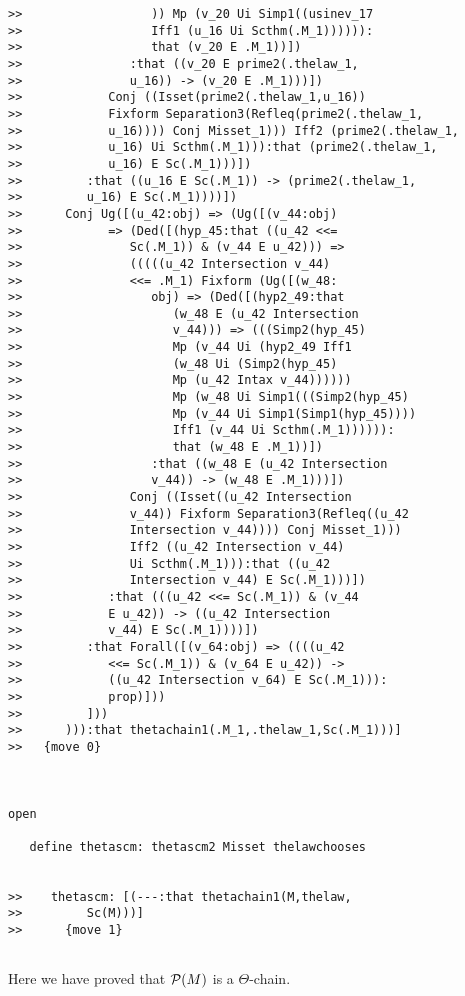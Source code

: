 \documentclass[12pt]{article}
\begin{document}
\begin{verbatim}
>>                  )) Mp (v_20 Ui Simp1((usinev_17
>>                  Iff1 (u_16 Ui Scthm(.M_1)))))):
>>                  that (v_20 E .M_1))])
>>               :that ((v_20 E prime2(.thelaw_1,
>>               u_16)) -> (v_20 E .M_1)))])
>>            Conj ((Isset(prime2(.thelaw_1,u_16))
>>            Fixform Separation3(Refleq(prime2(.thelaw_1,
>>            u_16)))) Conj Misset_1))) Iff2 (prime2(.thelaw_1,
>>            u_16) Ui Scthm(.M_1))):that (prime2(.thelaw_1,
>>            u_16) E Sc(.M_1)))])
>>         :that ((u_16 E Sc(.M_1)) -> (prime2(.thelaw_1,
>>         u_16) E Sc(.M_1))))])
>>      Conj Ug([(u_42:obj) => (Ug([(v_44:obj)
>>            => (Ded([(hyp_45:that ((u_42 <<=
>>               Sc(.M_1)) & (v_44 E u_42))) =>
>>               (((((u_42 Intersection v_44)
>>               <<= .M_1) Fixform (Ug([(w_48:
>>                  obj) => (Ded([(hyp2_49:that
>>                     (w_48 E (u_42 Intersection
>>                     v_44))) => (((Simp2(hyp_45)
>>                     Mp (v_44 Ui (hyp2_49 Iff1
>>                     (w_48 Ui (Simp2(hyp_45)
>>                     Mp (u_42 Intax v_44))))))
>>                     Mp (w_48 Ui Simp1(((Simp2(hyp_45)
>>                     Mp (v_44 Ui Simp1(Simp1(hyp_45))))
>>                     Iff1 (v_44 Ui Scthm(.M_1)))))):
>>                     that (w_48 E .M_1))])
>>                  :that ((w_48 E (u_42 Intersection
>>                  v_44)) -> (w_48 E .M_1)))])
>>               Conj ((Isset((u_42 Intersection
>>               v_44)) Fixform Separation3(Refleq((u_42
>>               Intersection v_44)))) Conj Misset_1)))
>>               Iff2 ((u_42 Intersection v_44)
>>               Ui Scthm(.M_1))):that ((u_42
>>               Intersection v_44) E Sc(.M_1)))])
>>            :that (((u_42 <<= Sc(.M_1)) & (v_44
>>            E u_42)) -> ((u_42 Intersection
>>            v_44) E Sc(.M_1))))])
>>         :that Forall([(v_64:obj) => ((((u_42
>>            <<= Sc(.M_1)) & (v_64 E u_42)) ->
>>            ((u_42 Intersection v_64) E Sc(.M_1))):
>>            prop)]))
>>         ]))
>>      ))):that thetachain1(.M_1,.thelaw_1,Sc(.M_1)))]
>>   {move 0}



open

   define thetascm: thetascm2 Misset thelawchooses


>>    thetascm: [(---:that thetachain1(M,thelaw,
>>         Sc(M)))]
>>      {move 1}


\end{verbatim}

Here we have proved that ${\cal P}(M)$ is a $\Theta$-chain.
\end{document}
